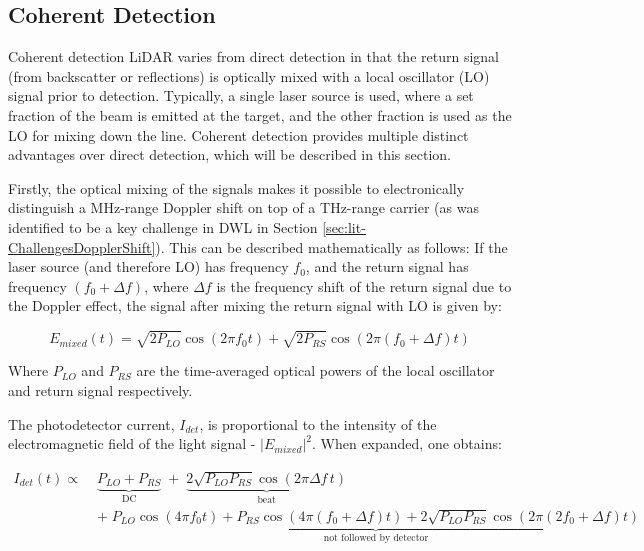         \subsection{Coherent Detection}
        \label{sec:lit-coherentDetection}
        Coherent detection LiDAR varies from direct detection in that the return signal (from backscatter or reflections) is optically mixed with a local oscillator (LO) signal prior to detection. Typically, a single laser source is used, where a set fraction of the beam is emitted at the target, and the other fraction is used as the LO for mixing down the line. Coherent detection provides multiple distinct advantages over direct detection, which will be described in this section.

        Firstly, the optical mixing of the signals makes it possible to electronically distinguish a MHz-range Doppler shift on top of a THz-range carrier (as was identified to be a key challenge in DWL in  Section \ref{sec:lit-ChallengesDopplerShift}). This can be described mathematically as follows: If the laser source (and therefore LO) has frequency $f_0$, and the return signal has frequency $(f_0 + \Delta f)$, where $\Delta f$ is the frequency shift of the return signal due to the Doppler effect, the signal after mixing the return signal with LO is given by:

        \begin{equation}
            E_{mixed}(t) = \sqrt{2P_{LO}}\cos(2\pi f_{0}t)
                 + \sqrt{2P_{RS}}\cos(2\pi (f_{0}+\Delta f)t)
        \label{eqn:opticallyMixed}
        \end{equation}

        Where $P_{LO}$ and $P_{RS}$ are the time-averaged optical powers of the local oscillator and return signal respectively.
        
        The photodetector current, $I_{det}$, is proportional to the intensity of the  electromagnetic field of the light signal - $|E_{mixed}|^2$. When expanded, one obtains:
        
        \begin{equation}
        \begin{split}
            I_{det}(t) \propto\;
            &\underbrace{P_{LO} + P_{RS}}_{\text{DC}}
            \;+\; \underbrace{2\sqrt{P_{LO}P_{RS}}\cos(2\pi \Delta f\, t)}_{\text{beat}} \\
            &+\; \underbrace{P_{LO}\cos(4\pi f_{0} t)
                + P_{RS}\cos\!\left(4\pi (f_{0}+\Delta f) t\right)
                + 2\sqrt{P_{LO}P_{RS}}\cos\!\left(2\pi (2f_{0}+\Delta f) t\right)}_{\text{not followed by detector}}
        \end{split}
        \label{eqn:squared}
        \end{equation}
        
